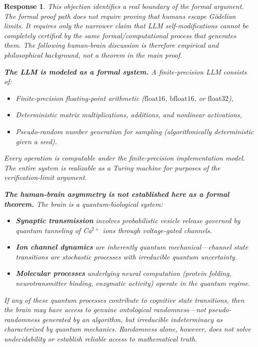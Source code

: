 \documentclass[11pt,a4paper]{article}
\newtheorem{response}{Response}
\begin{document}
\begin{response}
This objection identifies a real boundary of the formal argument. The formal proof path does not require proving that humans escape G\"{o}delian limits. It requires only the narrower claim that LLM self-modifications cannot be completely certified by the same formal/computational process that generates them. The following human-brain discussion is therefore empirical and philosophical background, not a theorem in the main proof.

\textbf{The LLM is modeled as a formal system.} A finite-precision LLM consists of:
\begin{itemize}
    \item Finite-precision floating-point arithmetic ($\text{float16}$, $\text{bfloat16}$, or $\text{float32}$),
    \item Deterministic matrix multiplications, additions, and nonlinear activations,
    \item Pseudo-random number generation for sampling (algorithmically deterministic given a seed).
\end{itemize}
Every operation is computable under the finite-precision implementation model. The entire system is realizable as a Turing machine for purposes of the verification-limit argument.

\textbf{The human-brain asymmetry is not established here as a formal theorem.} The brain is a quantum-biological system:
\begin{itemize}
    \item \textbf{Synaptic transmission} involves probabilistic vesicle release governed by quantum tunneling of Ca$^{2+}$ ions through voltage-gated channels.
    \item \textbf{Ion channel dynamics} are inherently quantum mechanical---channel state transitions are stochastic processes with irreducible quantum uncertainty.
    \item \textbf{Molecular processes} underlying neural computation (protein folding, neurotransmitter binding, enzymatic activity) operate in the quantum regime.
\end{itemize}
If any of these quantum processes contribute to cognitive state transitions, then the brain may have access to genuine ontological randomness---not pseudo-randomness generated by an algorithm, but irreducible indeterminacy as characterized by quantum mechanics. Randomness alone, however, does not solve undecidability or establish reliable access to mathematical truth.


\end{response}
\end{document}
